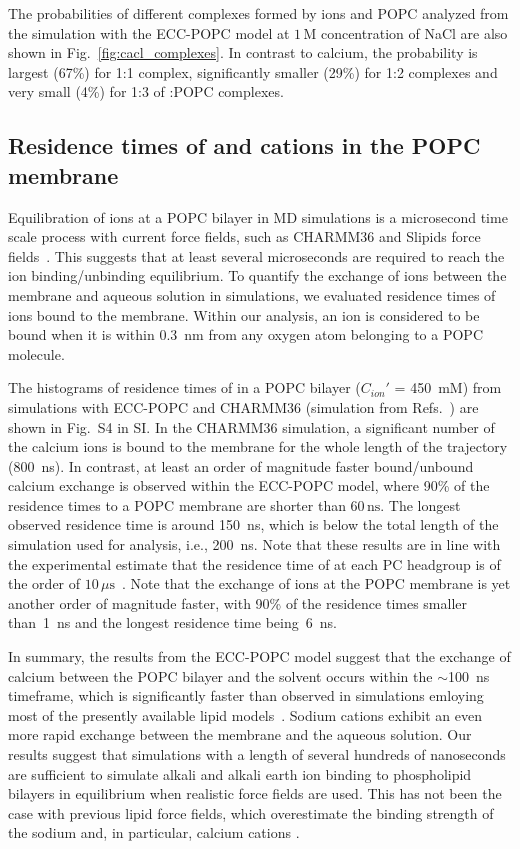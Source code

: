 \documentclass[journal=jpcbfk,manuscript=article]{achemso}
\begin{document}
The probabilities of different complexes formed by  ions and POPC
analyzed from the simulation with the ECC-POPC model at $1\,$M concentration of NaCl are also 
shown in Fig.~\ref{fig:cacl_complexes}. In contrast to calcium, the
probability is largest (67\%) for 1:1 complex, significantly smaller (29\%)
for 1:2 complexes and very small (4\%) for 1:3 of :POPC complexes.




\subsection{Residence times of  and  cations in the POPC membrane}

Equilibration of  ions at a POPC bilayer in MD simulations is a microsecond time scale process with current force fields, such  as CHARMM36 and Slipids force fields~\cite{javanainen17}. This suggests that at least several microseconds are required to reach the ion binding/unbinding equilibrium.
To quantify the exchange of ions between the membrane and aqueous solution in simulations, we evaluated residence times of ions bound to the membrane. Within our analysis, an ion is considered to be bound when it is within 0.3~nm from any oxygen atom belonging to a POPC molecule.

The histograms of residence times of  in a POPC bilayer ($C_{ion}'$ = 450~mM) from simulations with 
ECC-POPC and CHARMM36 (simulation from Refs.~) are shown in Fig.~S4 in SI.
In the CHARMM36 simulation, a significant number of the calcium ions is bound to the membrane for the whole length of the trajectory (800~ns).
In contrast, at least an order of magnitude faster bound/unbound calcium exchange is observed within the ECC-POPC model,
where 90\% of the  residence times to a POPC membrane are shorter than $60\,\mathrm{ns}$. The longest observed
residence time is around 150~ns, which is below the total length of the simulation used for analysis, i.e., 200~ns.
Note that these results are in line with the experimental estimate that the residence time of  at each PC
headgroup is of the order of $10\,\mu\mathrm{s}$~\cite{altenbach84}. Note that the exchange of  ions at the POPC membrane
is yet another order of magnitude faster, with 90\% of the residence times smaller than~1~ns and the longest residence time being~6~ns.

In summary, the results from the ECC-POPC model suggest that the exchange of calcium between the POPC bilayer and the solvent occurs within the $\sim$100~ns timeframe, which is significantly faster than observed in simulations emloying most of the presently available lipid models~\cite{javanainen17}. Sodium cations exhibit an even more rapid exchange between the membrane and the aqueous solution. Our results suggest that simulations with a length of several hundreds of nanoseconds are sufficient to simulate alkali and alkali earth ion binding to phospholipid bilayers in equilibrium when realistic force fields are used. This has not been the case with previous lipid force fields, which overestimate the binding strength of the sodium and, in particular,  calcium cations \cite{javanainen17, catte16}.
\end{document}

